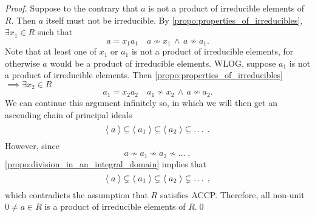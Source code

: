 \begin{proof}
  Suppose to the contrary that $a$ is not a product of irreducible elements of $R$. Then $a$ itself must not be irreducible. By \cref{propo:properties_of_irreducibles}, $\exists x_1 \in R$ such that
  \begin{equation*}
    a = x_1 a_1 \quad a \not\sim x_1 \, \land \, a \not\sim a_1.
  \end{equation*}
  Note that at least one of $x_1$ or $a_1$ is not a product of irreducible elements, for otherwise $a$ would be a product of irreducible elements. WLOG, suppose $a_1$ is not a product of irreducible elements. Then \cref{propo:properties_of_irreducibles} $\implies \exists x_2 \in R$
  \begin{equation*}
    a_1 = x_2 a_2 \quad a_1 \not\sim x_2 \, \land \, a \not\sim a_2.
  \end{equation*}
  We can continue this argument infinitely so, in which we will then get an ascending chain of principal ideals
  \begin{equation*}
    \langle \; a \; \rangle \subseteq \langle \; a_1 \; \rangle \subseteq \langle \; a_2 \; \rangle \subseteq \hdots \; .
  \end{equation*}
  However, since
  \begin{equation*}
    a \not\sim a_1 \not\sim a_2 \not\sim \hdots \;,
  \end{equation*}
  \cref{propo:division_in_an_integral_domain} implies that
  \begin{equation*}
    \langle \; a \; \rangle \subsetneq \langle \; a_1 \; \rangle \subsetneq \langle \; a_2 \; \rangle \subsetneq \hdots\; ,
  \end{equation*}
  which contradicts the assumption that $R$ satisfies ACCP. Therefore, all non-unit $0 \neq a \in R$ is a product of irreducible elements of $R$.\qed
\end{proof}



